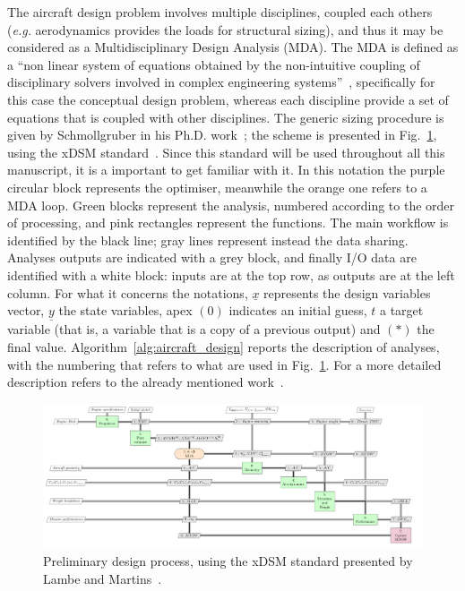 The aircraft design problem involves multiple disciplines, coupled each others (\textit{e.g.} aerodynamics provides the loads for structural sizing), and thus it may be considered as a Multidisciplinary Design Analysis (MDA).
The MDA is defined as a ``non linear system of equations obtained by the non-intuitive coupling of disciplinary solvers involved in complex engineering systems''~\cite{bib:martins_mdo, bib:gray_omdao}, specifically for this case the conceptual design problem, whereas each discipline provide a set of equations that is coupled with other disciplines.
The generic sizing procedure is given by Schmollgruber in his Ph.D. work~\cite{bib:schmollgruber_phd}; the scheme is presented in Fig.~\ref{fig:aircraft_design_xdsm}, using the \acs{xDSM} standard~\cite{bib:lambe_xdsm}.
Since this standard will be used throughout all this manuscript, it is a important to get familiar with it. 
In this notation the purple circular block represents the optimiser, meanwhile the orange one refers to a \acs{MDA} loop.
Green blocks represent the analysis, numbered according to the order of processing, and pink rectangles represent the functions.
The main workflow is identified by the black line; gray lines represent instead the data sharing.
Analyses outputs are indicated with a grey block, and finally I/O data are identified with a white block: inputs are at the top row, as outputs are at the left column.
For what it concerns the notations, $\underline{x}$ represents the design variables vector, $\underline{y}$ the state variables, apex $(0)$ indicates an initial guess, $t$ a target variable (that is, a variable that is a copy of a previous output) and $(*)$ the final value.  
Algorithm~\ref{alg:aircraft_design} reports the description of analyses, with the numbering that refers to what are used in Fig.~\ref{fig:aircraft_design_xdsm}. 
For a more detailed description refers to the already mentioned work~\cite{bib:schmollgruber_phd}.
\begin{figure}[!h]
	\centering
	\includegraphics[keepaspectratio, width=1.2\textwidth, angle=90]{images/chap1/MDA_aircraft_design}
	\caption{Preliminary design process, using the xDSM standard presented by Lambe and Martins~\cite{bib:lambe_xdsm}.}
	\label{fig:aircraft_design_xdsm}
\end{figure}

